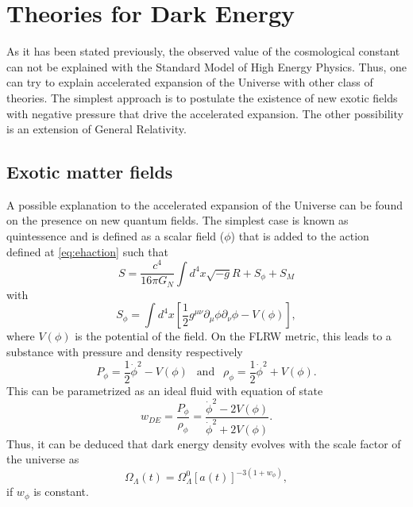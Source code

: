 \section{Theories for Dark Energy}
As it has been stated previously, the observed value of the cosmological constant can not be explained with the Standard Model of High Energy Physics. Thus, one can try to explain accelerated expansion of the Universe with other class of theories. The simplest approach is to postulate the existence of new exotic fields with negative pressure that drive the accelerated expansion. The other possibility is an extension of General Relativity.

\subsection{Exotic matter fields}
A possible explanation to the accelerated expansion of the Universe can be found on the presence on new quantum fields. The simplest case is known as quintessence and is defined as a scalar field  ($\phi$) that is added to the action defined at \autoref{eq:ehaction} such that
\begin{equation}
S = \frac{c^4}{16\pi G_N}\int d^4x\sqrt{-g}R+S_\phi+S_M
\end{equation}
with
\begin{equation}
S_\phi = \int d^4x\left[\frac{1}{2}g^{\mu\nu}\partial_\mu\phi\partial_\nu\phi-V(\phi)\right],
\end{equation}
where $V(\phi)$ is the potential of the field. On the FLRW metric, this leads to a substance with pressure and density respectively 
\begin{equation}
P_\phi = \frac{1}{2}\dot\phi^2-V(\phi)\ \ \mbox{ and }\ \ \rho_\phi=\frac{1}{2}\dot\phi^2+V(\phi).
\end{equation}
This can be parametrized as an ideal fluid with equation of state
\begin{equation}
w_{DE} = \frac{P_\phi}{\rho_\phi} = \frac{\dot\phi^2-2V(\phi)}{\dot\phi^2+2V(\phi)}.
\end{equation}
Thus, it can be deduced that dark energy density evolves with the scale factor of the universe as
\begin{equation}
\Omega_\Lambda(t) = \Omega_\Lambda^0 [a(t)]^{-3(1+w_\phi)},
\end{equation}
if $w_\phi$ is constant.
\newline

